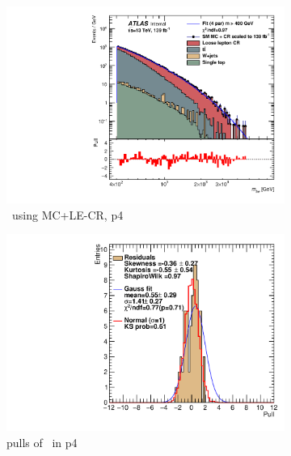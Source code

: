 \begin{figure}[H]
    \centering
    \begin{subfigure}[h]{0.38\linewidth}
    \includegraphics[scale=0.3]{figs/ch6/fit/variable_nosmooth/p4/10PB/output_SMMCplusCR_Mbe_p4.pdf}%
    \caption{\mbe \ using MC+LE-CR, p4}
    \end{subfigure}
    \hfill
    \begin{subfigure}[h]{0.4\linewidth}
    \includegraphics[scale=0.32]{figs/ch6/fit/variable_nosmooth/p4/10PB/pull_SMMCplusCR_Mbe_p4.pdf}%
    \caption{pulls of \mbe \ in p4}
    \end{subfigure}
    \hfill
    \begin{subfigure}[h]{0.38\linewidth}

\end{subfigure}
\end{figure}
